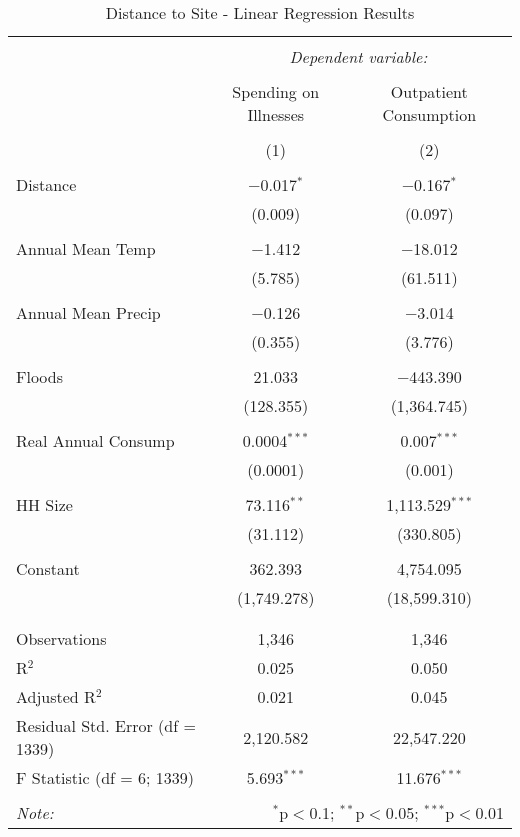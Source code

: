 
\begin{table}[!htbp] \centering 
  \caption{Distance to Site - Linear Regression Results} 
  \label{} 
\begin{tabular}{@{\extracolsep{5pt}}lcc} 
\\[-1.8ex]\hline 
\hline \\[-1.8ex] 
 & \multicolumn{2}{c}{\textit{Dependent variable:}} \\ 
\cline{2-3} 
\\[-1.8ex] & Spending on Illnesses & Outpatient Consumption \\ 
\\[-1.8ex] & (1) & (2)\\ 
\hline \\[-1.8ex] 
 Distance & $-$0.017$^{*}$ & $-$0.167$^{*}$ \\ 
  & (0.009) & (0.097) \\ 
  & & \\ 
 Annual Mean Temp & $-$1.412 & $-$18.012 \\ 
  & (5.785) & (61.511) \\ 
  & & \\ 
 Annual Mean Precip & $-$0.126 & $-$3.014 \\ 
  & (0.355) & (3.776) \\ 
  & & \\ 
 Floods & 21.033 & $-$443.390 \\ 
  & (128.355) & (1,364.745) \\ 
  & & \\ 
 Real Annual Consump & 0.0004$^{***}$ & 0.007$^{***}$ \\ 
  & (0.0001) & (0.001) \\ 
  & & \\ 
 HH Size & 73.116$^{**}$ & 1,113.529$^{***}$ \\ 
  & (31.112) & (330.805) \\ 
  & & \\ 
 Constant & 362.393 & 4,754.095 \\ 
  & (1,749.278) & (18,599.310) \\ 
  & & \\ 
\hline \\[-1.8ex] 
Observations & 1,346 & 1,346 \\ 
R$^{2}$ & 0.025 & 0.050 \\ 
Adjusted R$^{2}$ & 0.021 & 0.045 \\ 
Residual Std. Error (df = 1339) & 2,120.582 & 22,547.220 \\ 
F Statistic (df = 6; 1339) & 5.693$^{***}$ & 11.676$^{***}$ \\ 
\hline 
\hline \\[-1.8ex] 
\textit{Note:}  & \multicolumn{2}{r}{$^{*}$p$<$0.1; $^{**}$p$<$0.05; $^{***}$p$<$0.01} \\ 
\end{tabular} 
\end{table} 
